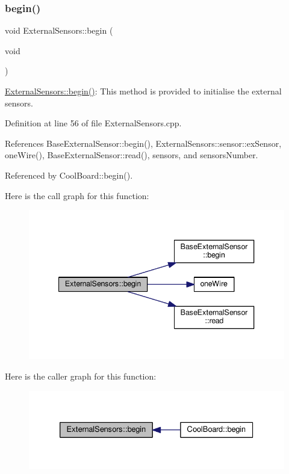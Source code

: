 \subsubsection{\texorpdfstring{begin()}{begin()}}
{\footnotesize\ttfamily void External\+Sensors\+::begin (\begin{DoxyParamCaption}\item[{void}]{ }\end{DoxyParamCaption})}

\hyperlink{class_external_sensors_a58ede0d786a86417254708870f04a21e}{External\+Sensors\+::begin()}\+: This method is provided to initialise the external sensors. 

Definition at line 56 of file External\+Sensors.\+cpp.



References Base\+External\+Sensor\+::begin(), External\+Sensors\+::sensor\+::ex\+Sensor, one\+Wire(), Base\+External\+Sensor\+::read(), sensors, and sensors\+Number.



Referenced by Cool\+Board\+::begin().

Here is the call graph for this function\+:\nopagebreak
\begin{figure}[H]
\begin{center}
\leavevmode
\includegraphics[width=340pt]{d1/d2f/class_external_sensors_a58ede0d786a86417254708870f04a21e_cgraph}
\end{center}
\end{figure}
Here is the caller graph for this function\+:\nopagebreak
\begin{figure}[H]
\begin{center}
\leavevmode
\includegraphics[width=326pt]{d1/d2f/class_external_sensors_a58ede0d786a86417254708870f04a21e_icgraph}
\end{center}
\end{figure}
\mbox{\label{class_external_sensors_a53177b81eca3be89508b5511ddcd00fc}} 
